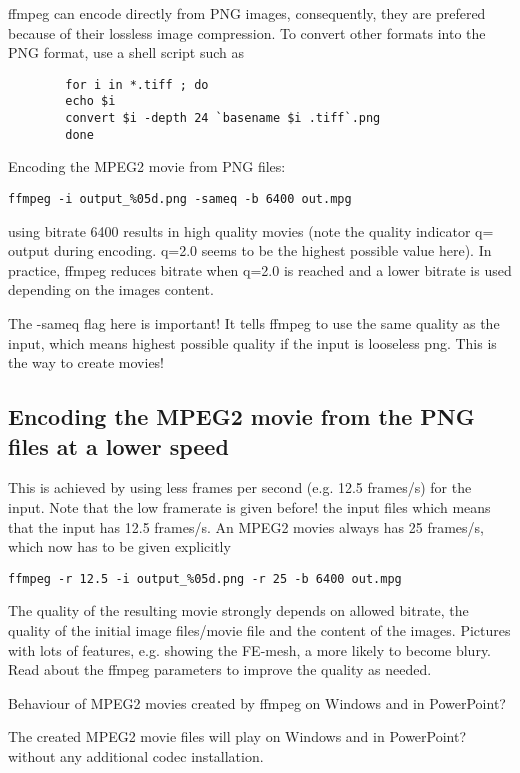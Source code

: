  ffmpeg can encode directly from PNG images, consequently, they are
prefered because of their lossless image compression. To convert other
formats into the PNG format, use a shell script such as

\begin{verbatim}
        for i in *.tiff ; do
        echo $i
        convert $i -depth 24 `basename $i .tiff`.png
        done
\end{verbatim}

Encoding the MPEG2 movie from PNG files:

\begin{verbatim}
ffmpeg -i output_%05d.png -sameq -b 6400 out.mpg
\end{verbatim}

 using bitrate 6400 results in high quality movies (note the quality
indicator q= output during encoding. q=2.0 seems to be the highest
possible value here). In practice, ffmpeg reduces bitrate when q=2.0
is reached and a lower bitrate is used depending on the images
content.

The -sameq flag here is important! It tells ffmpeg to use the same
quality as the input, which means highest possible quality if the
input is looseless png. This is the way to create movies!

\subsection{Encoding the MPEG2 movie from the PNG files at a lower speed}

 This is achieved by using less frames per second (e.g. 12.5 frames/s)
for the input. Note that the low framerate is given before! the input
files which means that the input has 12.5 frames/s. An MPEG2 movies
always has 25 frames/s, which now has to be given explicitly

\begin{verbatim}
ffmpeg -r 12.5 -i output_%05d.png -r 25 -b 6400 out.mpg
\end{verbatim}

 The quality of the resulting movie strongly depends on allowed
bitrate, the quality of the initial image files/movie file and the
content of the images. Pictures with lots of features, e.g. showing
the FE-mesh, a more likely to become blury. Read about the ffmpeg
parameters to improve the quality as needed.

 Behaviour of MPEG2 movies created by ffmpeg on Windows and in
PowerPoint?

 The created MPEG2 movie files will play on Windows and in PowerPoint?
without any additional codec installation.

